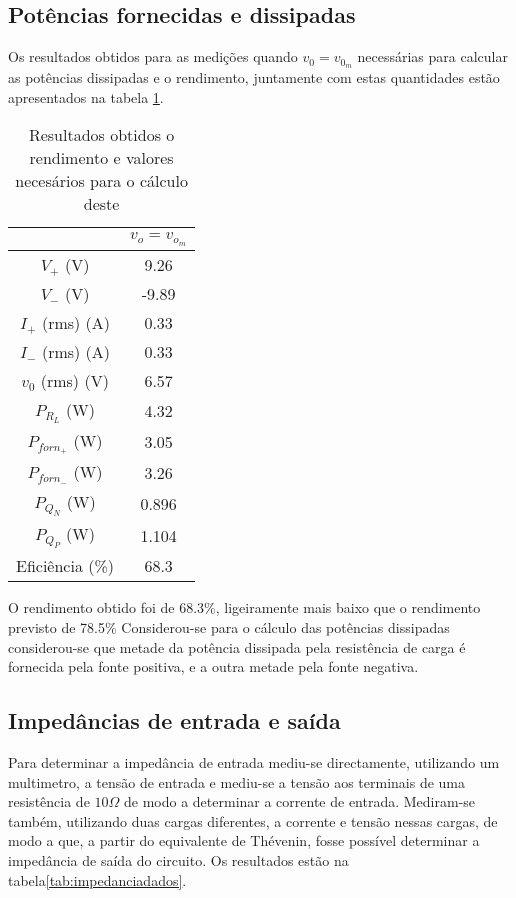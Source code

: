 \documentclass[%
  reprint,
  nofootinbib,
  amsmath,amssymb,
  aps,
  10pt,
  a4paper
]{revtex4-1}
\begin{document}
\subsection{Potências fornecidas e dissipadas}
Os resultados obtidos para as medições quando $v_0=v_{0_m}$ necessárias para calcular as potências dissipadas e o rendimento, juntamente com estas quantidades estão apresentados na tabela \ref{tab:fixe}.
\begin{table}[h]
\begin{tabular}{c|c}
                  & $v_{o}=v_{o_m}$ \\ \hline
$V_{+}$ (V)       & 9.26            \\ \hline
$V_{-}$ (V)       & -9.89           \\ \hline
$I_{+}$ (rms) (A) & 0.33            \\ \hline
$I_{-}$ (rms) (A) & 0.33            \\ \hline
$v_{0}$ (rms) (V) & 6.57            \\ \hline
$P_{R_L}$ (W)     & 4.32            \\ \hline
$P_{forn_+}$ (W)  & 3.05            \\ \hline
$P_{forn_-}$ (W)  & 3.26           \\ \hline
$P_{Q_N}$ (W)     & 0.896           \\ \hline
$P_{Q_P}$ (W)     & 1.104           \\ \hline
Eficiência (\%)   & 68.3          
\end{tabular}
\caption{Resultados obtidos o rendimento e valores necesários para o cálculo deste}
\label{tab:fixe}
\end{table}
O rendimento obtido foi de 68.3\%, ligeiramente mais baixo que o rendimento previsto de 78.5\%
Considerou-se para o cálculo das potências dissipadas considerou-se que metade da potência dissipada pela resistência  de carga é fornecida pela fonte positiva, e a outra metade pela fonte negativa.

\subsection{Impedâncias de entrada e saída}

Para determinar a impedância de entrada mediu-se directamente, utilizando um multimetro, a tensão de entrada e mediu-se a tensão aos terminais de uma resistência de $10 \Omega$ de modo a determinar a corrente de entrada. Mediram-se também, utilizando duas cargas diferentes, a corrente e tensão nessas cargas, de modo a que, a partir do equivalente de Thévenin, fosse possível determinar a impedância de saída do circuito. Os resultados estão na tabela\ref{tab:impedanciadados}.
\end{document}
